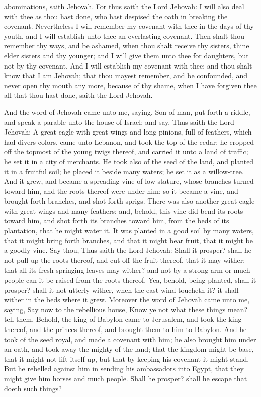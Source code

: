 abominations, saith Jehovah. For thus saith the Lord Jehovah: I will also deal with thee as thou hast done, who hast despised the oath in breaking the covenant.  Nevertheless I will remember my covenant with thee in the days of thy youth, and I will establish unto thee an everlasting covenant. Then shalt thou remember thy ways, and be ashamed, when thou shalt receive thy sisters, thine elder sisters and thy younger; and I will give them unto thee for daughters, but not by thy covenant. And I will establish my covenant with thee; and thou shalt know that I am Jehovah; that thou mayest remember, and be confounded, and never open thy mouth any more, because of thy shame, when I have forgiven thee all that thou hast done, saith the Lord Jehovah. 

And the word of Jehovah came unto me, saying, Son of man, put forth a riddle, and speak a parable unto the house of Israel; and say, Thus saith the Lord Jehovah: A great eagle with great wings and long pinions, full of feathers, which had divers colors, came unto Lebanon, and took the top of the cedar: he cropped off the topmost of the young twigs thereof, and carried it unto a land of traffic; he set it in a city of merchants. He took also of the seed of the land, and planted it in a fruitful soil; he placed it beside many waters; he set it as a willow-tree. And it grew, and became a spreading vine of low stature, whose branches turned toward him, and the roots thereof were under him: so it became a vine, and brought forth branches, and shot forth sprigs.  There was also another great eagle with great wings and many feathers: and, behold, this vine did bend its roots toward him, and shot forth its branches toward him, from the beds of its plantation, that he might water it. It was planted in a good soil by many waters, that it might bring forth branches, and that it might bear fruit, that it might be a goodly vine. Say thou, Thus saith the Lord Jehovah: Shall it prosper? shall he not pull up the roots thereof, and cut off the fruit thereof, that it may wither; that all its fresh springing leaves may wither? and not by a strong arm or much people can it be raised from the roots thereof. Yea, behold, being planted, shall it prosper? shall it not utterly wither, when the east wind toucheth it? it shall wither in the beds where it grew.  Moreover the word of Jehovah came unto me, saying, Say now to the rebellious house, Know ye not what these things mean? tell them, Behold, the king of Babylon came to Jerusalem, and took the king thereof, and the princes thereof, and brought them to him to Babylon. And he took of the seed royal, and made a covenant with him; he also brought him under an oath, and took away the mighty of the land; that the kingdom might be base, that it might not lift itself up, but that by keeping his covenant it might stand. But he rebelled against him in sending his ambassadors into Egypt, that they might give him horses and much people. Shall he prosper? shall he escape that doeth such things? 